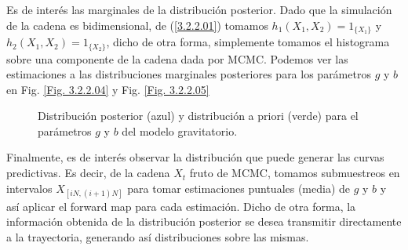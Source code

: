 Es de interés las marginales de la distribución posterior. Dado que la simulación de la cadena es bidimensional, de (\ref{3.2.2.01}) tomamos $h_1(X_1,X_2) = 1_{\{X_1\}}$ y $h_2(X_1,X_2)= 1_{\{X_2\}}$, dicho de otra forma, simplemente tomamos el histograma sobre una componente de la cadena dada por MCMC. Podemos ver las estimaciones a las distribuciones marginales posteriores para los parámetros $g$ y $b$ en  Fig. \ref{Fig. 3.2.2.04} y Fig. \ref{Fig. 3.2.2.05}

\begin{figure}[h]
    \centering
    \qquad
    \caption{Distribución posterior (azul) y distribución a priori (verde) para el parámetros $g$ y $b$ del modelo gravitatorio. }
    \label{Fig. 3.2.gravedad.theta}
\end{figure}

Finalmente, es de interés observar la distribución que puede generar las curvas predictivas. Es decir, de la cadena $X_t$ fruto de MCMC, tomamos submuestreos en intervalos $X_{[iN,(i+1)N]}$ para tomar estimaciones puntuales (media) de $g$ y $b$ y así aplicar el forward map para cada estimación. Dicho de otra forma, la información obtenida de la distribución posterior se desea transmitir directamente a la trayectoria, generando así distribuciones sobre las mismas.

